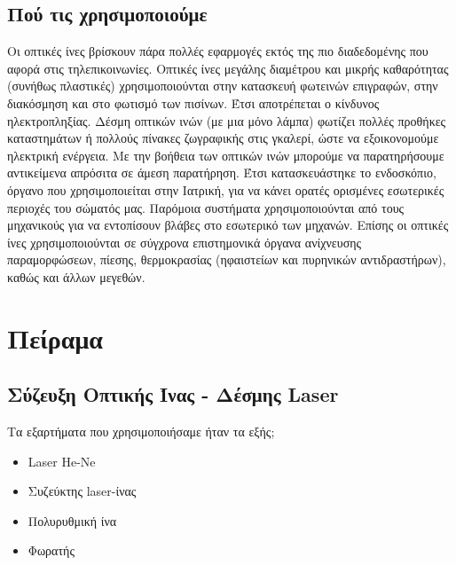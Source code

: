 \documentclass[a4paper,11pt,titlepage]{article}
\begin{document}
\subsection{Πού τις χρησιμοποιούμε}

Οι οπτικές ίνες βρίσκουν πάρα πολλές εφαρμογές εκτός της πιο διαδεδομένης που αφορά στις τηλεπικοινωνίες. Οπτικές ίνες μεγάλης διαμέτρου και μικρής καθαρότητας (συνήθως πλαστικές) χρησιμοποιούνται στην κατασκευή φωτεινών επιγραφών, στην διακόσμηση και στο φωτισμό των πισίνων. Έτσι αποτρέπεται ο κίνδυνος ηλεκτροπληξίας. Δέσμη οπτικών ινών (με μια μόνο λάμπα) φωτίζει πολλές προθήκες καταστημάτων ή πολλούς πίνακες ζωγραφικής στις γκαλερί, ώστε να εξοικονομούμε ηλεκτρική ενέργεια. Με την βοήθεια των οπτικών ινών μπορούμε να παρατηρήσουμε αντικείμενα απρόσιτα σε άμεση παρατήρηση. Έτσι κατασκευάστηκε το ενδοσκόπιο, όργανο που χρησιμοποιείται στην Ιατρική, για να κάνει ορατές ορισμένες εσωτερικές περιοχές του σώματός μας. Παρόμοια συστήματα χρησιμοποιούνται από τους μηχανικούς για να εντοπίσουν βλάβες στο εσωτερικό των μηχανών. Επίσης οι οπτικές ίνες χρησιμοποιούνται σε σύγχρονα επιστημονικά όργανα ανίχνευσης παραμορφώσεων, πίεσης, θερμοκρασίας (ηφαιστείων και πυρηνικών αντιδραστήρων), καθώς και άλλων μεγεθών.
\newpage

\section{Πείραμα}

\subsection{Σύζευξη Οπτικής Ίνας - Δέσμης Laser}

Τα εξαρτήματα που χρησιμοποιήσαμε ήταν τα εξής;
\begin{itemize}
\item Laser He-Ne
\item Συζεύκτης laser-ίνας
\item Πολυρυθμική ίνα
\item Φωρατής
\end{itemize}
\end{document}
